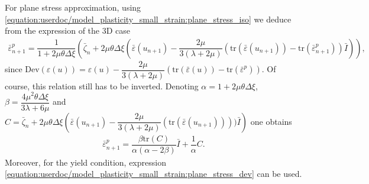 \documentclass[a4paper,11pt,english]{sphinxmanual}
\begin{document}
For plane stress approximation, using \eqref{equation:userdoc/model_plasticity_small_strain:plane_stress_iso} we deduce from the expression of the 3D case
\begin{equation*}
\begin{split}\bar{\varepsilon}^p_{n+1} = \dfrac{1}{1+2\mu\theta\Delta \xi}\left(\bar{\zeta}_{n} +2\mu\theta\Delta \xi\left(\bar{\varepsilon}(u_{n+1}) - \dfrac{2\mu}{3(\lambda+2\mu)}(\mbox{tr}(\bar{\varepsilon}(u_{n+1})) - \mbox{tr}(\bar{\varepsilon}_{n+1}^p))\bar{I}\right) \right),\end{split}
\end{equation*}
since \(\mbox{Dev}(\varepsilon(u)) = \varepsilon(u) - \dfrac{2\mu}{3(\lambda+2\mu)}(\mbox{tr}(\bar{\varepsilon}(u)) - \mbox{tr}(\bar{\varepsilon}^p))\). Of course, this relation still has to be inverted. Denoting \(\alpha = 1+2\mu\theta\Delta \xi\), \(\beta = \dfrac{4\mu^2\theta\Delta \xi}{3\lambda+6\mu}\) and \(C = \bar{\zeta}_{n} +2\mu\theta\Delta \xi\left(\bar{\varepsilon}(u_{n+1}) - \dfrac{2\mu}{3(\lambda+2\mu)}(\mbox{tr}(\bar{\varepsilon}(u_{n+1}))))\bar{I}\right)\) one obtains
\begin{equation*}
\begin{split}\bar{\varepsilon}^p_{n+1} = \dfrac{\beta \mbox{tr}(C)}{\alpha(\alpha-2\beta)}\bar{I} + \dfrac{1}{\alpha}C.\end{split}
\end{equation*}
Moreover, for the yield condition, expression \eqref{equation:userdoc/model_plasticity_small_strain:plane_stress_dev} can be used.
\end{document}
